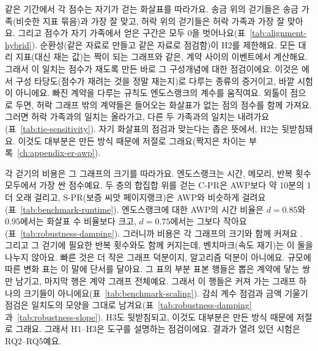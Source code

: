 같은 기간에서 각 점수는 자기가 걷는 화살표를 따라가요. 송금 위의 걷기들은 송금 가족(비슷한 지표 묶음)과 가장 잘 맞고, 허락 위의 걷기들은 허락 가족과 가장 잘 맞아요. 그리고 점수가 자기 가족에서 얻은 구간은 모두 0을 벗어나요(표~\ref{tab:alignment-hybrid}). 순환성(같은 자료로 만들고 같은 자료로 점검함)이 H2를 제한해요. 모든 대리 지표(대신 재는 값)는 짝이 되는 그래프와 같은, 계약 사이의 이벤트에서 계산해요. 그래서 이 일치는 점수가 재도록 만든 바로 그 구성개념에 대한 점검이에요. 이것은 \textcite{cronbach1955construct}에서 구성 타당도(점수가 재려는 것을 정말 재는지)로 다루는 종류의 증거이고, 바깥 시험이 아니에요. 빠진 계약을 다루는 규칙도 엔도스랭크의 계수를 움직여요. 외톨이 점으로 두면, 허락 그래프 밖의 계약들은 들어오는 화살표가 없는 점의 점수를 함께 가져요. 그러면 허락 가족과의 일치는 올라가고, 다른 두 가족과의 일치는 내려가요(표~\ref{tab:tie-sensitivity}). 자기 화살표의 점검과 맞는다는 좁은 뜻에서, H2는 뒷받침돼요. 이것도 대부분은 만든 방식 때문에 저절로 그래요(짝지은 차이는 부록~\ref{ch:appendix-er-awp}).

각 걷기의 비용은 그 그래프의 크기를 따라가요. 엔도스랭크는 시간, 메모리, 반복 횟수 모두에서 가장 싼 점수예요. 두 층의 합집합 위를 걷는 \mbox{C-PR}은 AWP보다 약 10분의 1 더 오래 걸리고, \mbox{S-PR}(보증 씨앗 페이지랭크)은 AWP와 비슷하게 걸려요(표~\ref{tab:benchmark-runtime}). 엔도스랭크에 대한 AWP의 시간 비율은 $d=0.85$와 $0.95$에서는 화살표 수 비율보다 크고, $d=0.75$에서는 그보다 작아요(표~\ref{tab:robustness-damping}). 그러니까 비용은 각 그래프의 크기와 함께 커져요 \parencite{langville2006pagerank}. 그리고 그 걷기에 필요한 반복 횟수와도 함께 커지는데, 벤치마크(속도 재기)는 이 둘을 나누지 않아요. 빠른 것은 더 작은 그래프 덕분이지, 알고리즘 덕분이 아니에요. 규모에 따른 변화 표는 이 말에 단서를 달아요. 그 표의 부분 표본 행들은 뽑은 계약에 닿는 쌍만 남기고, 마지막 행은 계약 그래프 전체예요. 그래서 이 행들은 커져 가는 그래프 하나의 크기들이 아니에요(표~\ref{tab:benchmark-scaling}). 감쇠 계수 점검과 금액 기울기 점검은 일치도의 모양을 그대로 남겨요(표~\ref{tab:robustness-damping}과~\ref{tab:robustness-slope}). H3도 뒷받침되고, 이것도 대부분은 만든 방식 때문에 저절로 그래요. 그래서 H1--H3은 도구를 설명하는 점검이에요. 결과가 열려 있던 시험은 RQ2--RQ5예요.


